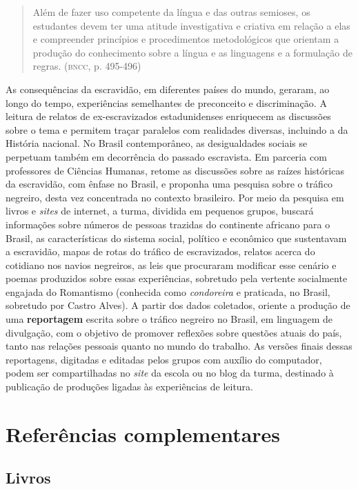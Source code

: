 \documentclass[11pt]{extarticle}
\begin{document}
\begin{enumerate}
\begin{quote}
Além de fazer uso competente da língua e das outras semioses, os
estudantes devem ter uma atitude investigativa e criativa em relação a
elas e compreender princípios e procedimentos metodológicos que orientam
a produção do conhecimento sobre a língua e as linguagens e a formulação
de regras. (\textsc{bncc}, p. 495-496)
\end{quote}

As consequências da escravidão, em diferentes países do mundo,
geraram, ao longo do tempo, experiências semelhantes de preconceito e
discriminação. A leitura de relatos de ex-escravizados estadunidenses
enriquecem as discussões sobre o tema e permitem traçar paralelos com
realidades diversas, incluindo a da História nacional. No Brasil
contemporâneo, as desigualdades sociais se perpetuam também em
decorrência do passado escravista. Em parceria com professores de
Ciências Humanas, retome as discussões sobre as raízes históricas da
escravidão, com ênfase no Brasil, e proponha uma pesquisa sobre o
tráfico negreiro, desta vez concentrada no contexto brasileiro. Por
meio da pesquisa em livros e \emph{sites} de internet, a turma,
dividida em pequenos grupos, buscará informações sobre números de
pessoas trazidas do continente africano para o Brasil, as
características do sistema social, político e econômico que
sustentavam a escravidão, mapas de rotas do tráfico de escravizados,
relatos acerca do cotidiano nos navios negreiros, as leis que
procuraram modificar esse cenário e poemas produzidos sobre essas
experiências, sobretudo pela vertente socialmente engajada do
Romantismo (conhecida como \emph{condoreira} e praticada, no Brasil,
sobretudo por Castro Alves). A partir dos dados coletados, oriente a
produção de uma \textbf{reportagem} escrita sobre o tráfico negreiro
no Brasil, em linguagem de divulgação, com o objetivo de promover
reflexões sobre questões atuais do país, tanto nas relações pessoais
quanto no mundo do trabalho. As versões finais dessas reportagens,
digitadas e editadas pelos grupos com auxílio do computador, podem ser
compartilhadas no \emph{site} da escola ou no blog da turma, destinado
à publicação de produções ligadas às experiências de leitura.

\section{Referências complementares}

\subsection{Livros}


\end{enumerate}
\end{document}
